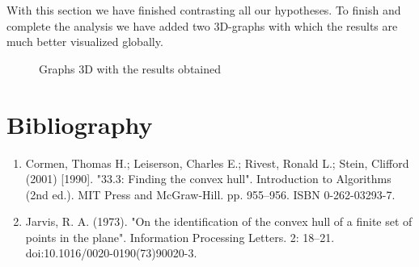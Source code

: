 \documentclass[12pt,a4paper]{article}
\begin{document}
With this section we have finished contrasting all our hypotheses. To finish and  complete the analysis we have added two 3D-graphs with which the results are much better visualized globally.
\begin{figure}[H]
 \centering
 \caption{Graphs 3D with the results obtained}
 \label{f:results_prob}
\end{figure}


\section*{Bibliography}
\begin{enumerate}
\item Cormen, Thomas H.; Leiserson, Charles E.; Rivest, Ronald L.; Stein, Clifford (2001) [1990]. "33.3: Finding the convex hull". Introduction to Algorithms (2nd ed.). MIT Press and McGraw-Hill. pp. 955–956. ISBN 0-262-03293-7.

\item Jarvis, R. A. (1973). "On the identification of the convex hull of a finite set of points in the plane". Information Processing Letters. 2: 18–21. doi:10.1016/0020-0190(73)90020-3.
\end{enumerate}
\end{document}
